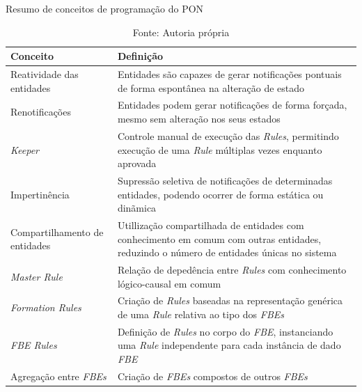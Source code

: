 \begin{table}[!htb]
\centering
\caption{Resumo de conceitos de programação do PON}
\caption*{Fonte: Autoria própria}
\label{tab:resumo_conceitos}
\begin{tabularx}{\textwidth}{l|X}
Conceito                              & Definição                                                                                                                                  \\ \hline\hline
Reatividade das entidades             & Entidades são capazes de gerar notificações pontuais de forma espontânea na alteração de estado                                            \\ \hline
Renotificações                        & Entidades podem gerar notificações de forma forçada, mesmo sem alteração nos seus estados                                                  \\ \hline
\textit{Keeper}                       & Controle manual de execução das \textit{Rules}, permitindo execução de uma \textit{Rule} múltiplas vezes enquanto aprovada                 \\ \hline
Impertinência                         & Supressão seletiva de notificações de determinadas entidades, podendo ocorrer de forma estática ou dinãmica                                \\ \hline
Compartilhamento de entidades         & Utillização compartilhada de entidades com conhecimento em comum com outras entidades, reduzindo o número de entidades únicas no sistema   \\ \hline
\textit{Master Rule}                  & Relação de depedência entre \textit{Rules} com conhecimento lógico-causal em comum                                                         \\ \hline
\textit{Formation Rules}              & Criação de \textit{Rules} baseadas na representação genérica de uma \textit{Rule} relativa ao tipo dos \textit{FBEs}                       \\ \hline
\textit{FBE Rules}                    & Definição de \textit{Rules} no corpo do \textit{FBE}, instanciando uma \textit{Rule} independente para cada instância de dado \textit{FBE} \\ \hline
Agregação entre \textit{FBEs}         & Criação de \textit{FBEs} compostos de outros \textit{FBEs}                                                                                 \\ \hline
\end{tabularx}
\end{table}

